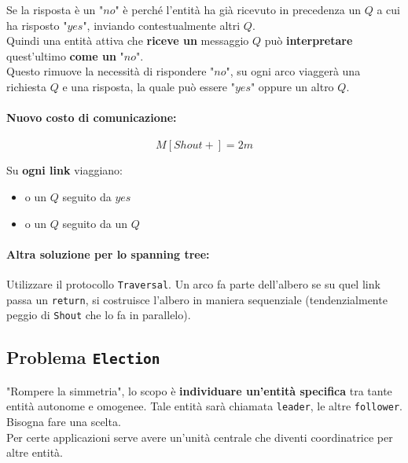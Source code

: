 Se la risposta è un "$no$" è perché l'entità ha già ricevuto in precedenza un $Q$ a cui ha risposto "$yes$", inviando contestualmente altri $Q$.\\

Quindi una entità attiva che \textbf{riceve un} messaggio $Q$ può \textbf{interpretare} quest'ultimo \textbf{come un} "$no$".\\

Questo rimuove la necessità di rispondere "$no$", su ogni arco viaggerà una richiesta $Q$ e una risposta, la quale può essere "$yes$" oppure un altro $Q$.\\

\paragraph{Nuovo costo di comunicazione:}
$$ M[Shout+] = 2m $$ 

Su \textbf{ogni link} viaggiano: 
\begin{itemize}
	\item o un $Q$ seguito da $yes$
	\item o un $Q$ seguito da un $Q$
\end{itemize}

\vfill 

\paragraph{Altra soluzione per lo spanning tree:} Utilizzare il protocollo \texttt{Traversal}. Un arco fa parte dell'albero se su quel link passa un \texttt{return}, si costruisce l'albero in maniera sequenziale (tendenzialmente peggio di \texttt{Shout} che lo fa in parallelo).\\


\newpage

\subsection{Problema \texttt{Election}}

"Rompere la simmetria", lo scopo è \textbf{individuare un'entità specifica} tra tante entità autonome e omogenee. Tale entità sarà chiamata \texttt{leader}, le altre \texttt{follower}. Bisogna fare una scelta.\\
Per certe applicazioni serve avere un'unità centrale che diventi coordinatrice per altre entità.\\


